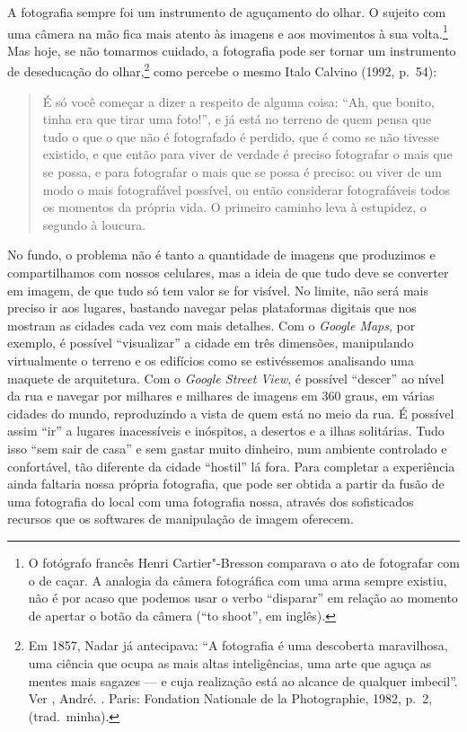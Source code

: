 A fotografia sempre foi um instrumento de aguçamento do olhar. O sujeito
com uma câmera na mão fica mais atento às imagens e aos movimentos à sua
volta.\footnote{O fotógrafo francês Henri Cartier"-Bresson comparava o
  ato de fotografar com o de caçar. A analogia da câmera fotográfica com
  uma arma sempre existiu, não é por acaso que podemos usar o verbo
  ``disparar'' em relação ao momento de apertar o botão da câmera (``to
  shoot'', em inglês).} Mas hoje, se não tomarmos cuidado, a fotografia
pode ser tornar um instrumento de deseducação do olhar,\footnote{Em
  1857, Nadar já antecipava: ``A fotografia é uma descoberta
  maravilhosa, uma ciência que ocupa as mais altas inteligências, uma
  arte que aguça as mentes mais sagazes --- e cuja realização está ao
  alcance de qualquer imbecil''. Ver , André. {}.
  Paris: Fondation Nationale de la Photographie, 1982, p.~2, (trad.~minha).} como percebe o mesmo Italo Calvino (1992, p.~54):

\begin{quote}
É só você começar a dizer a respeito de alguma coisa: ``Ah, que bonito,
tinha era que tirar uma foto!'', e já está no terreno de quem pensa que
tudo o que o que não é fotografado é perdido, que é como se não tivesse
existido, e que então para viver de verdade é preciso fotografar o mais
que se possa, e para fotografar o mais que se possa é preciso: ou viver
de um modo o mais fotografável possível, ou então considerar
fotografáveis todos os momentos da própria vida. O primeiro caminho leva
à estupidez, o segundo à loucura.
\end{quote}

No fundo, o problema não é tanto a quantidade de imagens que produzimos e compartilhamos com nossos celulares, mas a ideia de que tudo deve se converter em imagem, de que tudo só tem valor se for visível. No limite, não será mais preciso ir aos lugares, bastando navegar pelas
plataformas digitais que nos mostram as cidades cada vez com mais
detalhes. Com o \emph{Google Maps}, por exemplo, é possível
``visualizar'' a cidade em três dimensões, manipulando virtualmente o
terreno e os edifícios como se estivéssemos analisando uma maquete de
arquitetura. Com o \emph{Google Street View}, é possível ``descer'' ao
nível da rua e navegar por milhares e milhares de imagens em 360 graus,
em várias cidades do mundo, reproduzindo a vista de quem está no meio da
rua. É possível assim ``ir'' a lugares inacessíveis e inóspitos, a
desertos e a ilhas solitárias. Tudo isso ``sem sair de casa'' e sem
gastar muito dinheiro, num ambiente controlado e confortável, tão
diferente da cidade ``hostil'' lá fora. Para completar a experiência
ainda faltaria nossa própria fotografia, que pode ser obtida a partir da
fusão de uma fotografia do local com uma fotografia nossa, através dos
sofisticados recursos que os softwares de manipulação de imagem
oferecem.

